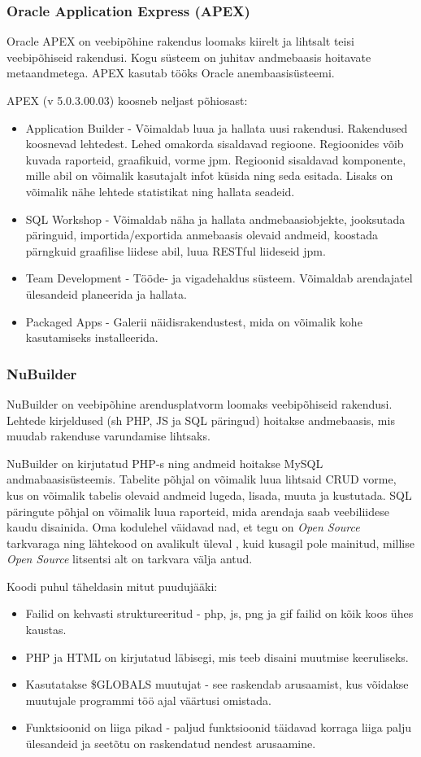 \documentclass[a4paper,12pt]{article} %
\begin{document}
\subsubsection{Oracle Application Express (APEX)}
Oracle APEX on veebipõhine rakendus loomaks kiirelt ja lihtsalt teisi veebipõhiseid rakendusi. Kogu süsteem on juhitav andmebaasis hoitavate metaandmetega. APEX kasutab tööks Oracle anembaasisüsteemi.\par
APEX (v 5.0.3.00.03) koosneb neljast põhiosast:
\begin{itemize}
\item Application Builder - Võimaldab luua ja hallata uusi rakendusi. Rakendused koosnevad lehtedest. Lehed omakorda sisaldavad regioone. Regioonides võib kuvada raporteid, graafikuid, vorme jpm. Regioonid sisaldavad komponente, mille abil on võimalik kasutajalt infot küsida ning seda esitada. Lisaks on võimalik nähe lehtede statistikat ning hallata seadeid.
\item SQL Workshop - Võimaldab näha ja hallata andmebaasiobjekte, jooksutada päringuid, importida/exportida anmebaasis olevaid andmeid, koostada pärngkuid graafilise liidese abil, luua RESTful liideseid jpm.
\item Team Development - Tööde- ja vigadehaldus süsteem. Võimaldab arendajatel ülesandeid planeerida ja hallata.
\item Packaged Apps - Galerii näidisrakendustest, mida on võimalik kohe kasutamiseks installeerida.
\end{itemize}
\cite{Oracle_APEX}
\subsubsection{NuBuilder}
NuBuilder on veebipõhine arendusplatvorm loomaks veebipõhiseid rakendusi. Lehtede kirjeldused (sh PHP, JS ja SQL päringud) hoitakse andmebaasis, mis muudab rakenduse varundamise lihtsaks.\par
NuBuilder on kirjutatud PHP-s ning andmeid hoitakse MySQL andmabaasisüsteemis. Tabelite põhjal on võimalik luua lihtsaid CRUD vorme, kus on võimalik tabelis olevaid andmeid lugeda, lisada, muuta ja kustutada. SQL päringute põhjal on võimalik luua raporteid, mida arendaja saab veebiliidese kaudu disainida.
Oma kodulehel väidavad nad, et tegu on \textit{Open Source} tarkvaraga ning lähtekood on avalikult üleval \cite{nuBuilderGitHub}, kuid kusagil pole mainitud, millise \textit{Open Source} litsentsi alt on tarkvara välja antud.\par
Koodi puhul täheldasin mitut puudujääki:
\begin{itemize}
\item Failid on kehvasti struktureeritud - php, js, png ja gif failid on kõik koos ühes kaustas.
\item PHP ja HTML on kirjutatud läbisegi, mis teeb disaini muutmise keeruliseks.
\item Kasutatakse \$GLOBALS muutujat - see raskendab arusaamist, kus võidakse muutujale programmi töö ajal väärtusi omistada.
\item Funktsioonid on liiga pikad - paljud funktsioonid täidavad korraga liiga palju ülesandeid ja seetõtu on raskendatud nendest arusaamine.
\end{itemize}
\cite{nuBuilder}
\end{document}
